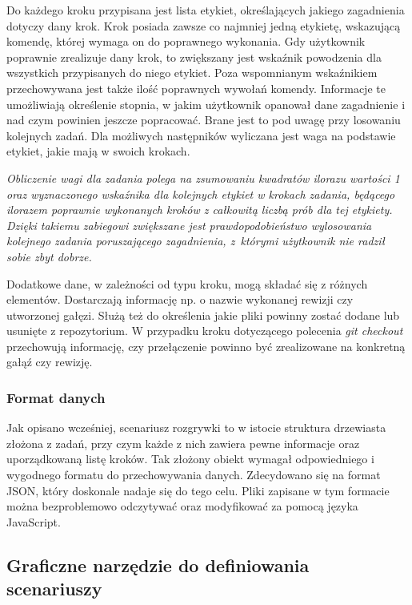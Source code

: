 \documentclass[12pt,a4paper,polish,thesis]{dcsbook}
\begin{document}
{	Do każdego kroku przypisana jest lista etykiet, określających jakiego zagadnienia dotyczy dany krok. Krok posiada zawsze co najmniej jedną etykietę, wskazującą komendę, której wymaga on do poprawnego wykonania. Gdy użytkownik poprawnie zrealizuje dany krok, to zwiększany jest wskaźnik powodzenia dla wszystkich przypisanych do niego etykiet. Poza wspomnianym wskaźnikiem przechowywana jest także ilość poprawnych wywołań komendy. Informacje te umożliwiają określenie stopnia, w jakim użytkownik opanował dane zagadnienie i nad czym powinien jeszcze popracować. Brane jest to pod uwagę przy losowaniu kolejnych zadań. Dla możliwych następników wyliczana jest waga na podstawie etykiet, jakie mają w swoich krokach.

	\textit{Obliczenie wagi dla zadania polega na zsumowaniu kwadratów ilorazu wartości 1 oraz wyznaczonego wskaźnika dla kolejnych etykiet w krokach zadania, będącego ilorazem poprawnie wykonanych kroków z całkowitą liczbą prób dla tej etykiety. Dzięki takiemu zabiegowi zwiększane jest prawdopodobieństwo wylosowania kolejnego zadania poruszającego zagadnienia, z~którymi użytkownik nie radził sobie zbyt dobrze.}

	Dodatkowe dane, w zależności od typu kroku, mogą składać się z różnych elementów. Dostarczają informację np. o nazwie wykonanej rewizji czy utworzonej gałęzi. Służą też do określenia jakie pliki powinny zostać dodane lub usunięte z repozytorium. W przypadku kroku dotyczącego polecenia \textit{git checkout} przechowują informację, czy przełączenie powinno być zrealizowane na konkretną gałąź czy rewizję.

	\subsubsection{Format danych}

	Jak opisano wcześniej, scenariusz rozgrywki to w istocie struktura drzewiasta złożona z zadań, przy czym każde z nich zawiera pewne informacje oraz uporządkowaną listę kroków. Tak złożony obiekt wymagał odpowiedniego i wygodnego formatu do przechowywania danych. Zdecydowano się na format JSON, który doskonale nadaje się do tego celu. Pliki zapisane w tym formacie można bezproblemowo odczytywać oraz modyfikować za pomocą języka JavaScript.

	\subsection{Graficzne narzędzie do definiowania scenariuszy}

}
\end{document}
